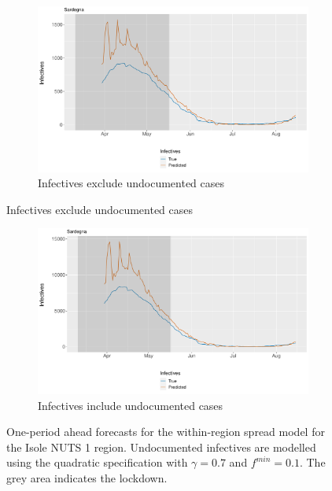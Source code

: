 \documentclass[12pt]{article}
\begin{document}
\begin{appendices}
		\begin{figure}[H]
    	    \centering
    	    \begin{subfigure}{\textwidth}
    	      \centering
    	      \includegraphics[width=0.94\linewidth]{output/model_within_lag14_forecast_start20_Isole_rolling.pdf}
    	      \caption{Infectives exclude undocumented cases}
    	      \label{fig:forecast_within_isole_regular}
    	    \end{subfigure}
        \end{figure}
        \begin{figure}[H]\ContinuedFloat
    	    \begin{subfigure}{\textwidth}
    	      \centering
    	      \includegraphics[width=0.94\linewidth]{output/model_within_lag14_forecast_start20_Isole_UndocQuadratic_rolling.pdf}
    	      \caption{Infectives include undocumented cases}
    	      \label{fig:forecast_within_isole_undoc}
    	    \end{subfigure}
    	    \caption{One-period ahead forecasts for the within-region spread model for the Isole NUTS 1 region. Undocumented infectives are modelled using the quadratic specification with $\gamma = 0.7$ and $f^{min}=0.1$. The grey area indicates the lockdown.}
    	    \label{fig:forecast_within_isole}
        \end{figure}
		

\end{appendices}
\end{document}
